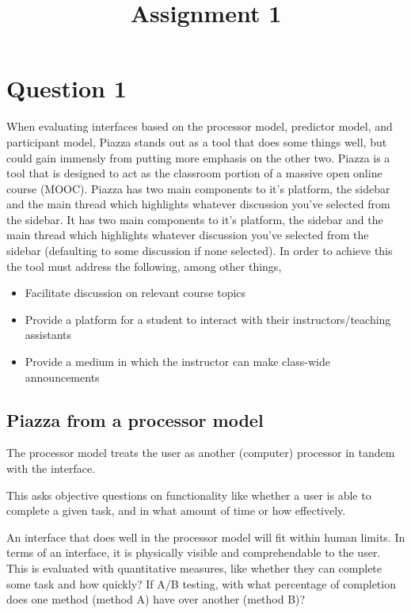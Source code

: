 

\title{Assignment 1\\}



\maketitle

\section{Question 1}
When evaluating interfaces based on the processor model, predictor model, and participant model, Piazza stands out as a tool that does some things well, but could gain immensly from putting more emphasis on the other two. Piazza is a tool that is designed to act as the classroom portion of a massive open online course (MOOC). Piazza has two main components to it's platform, the sidebar and the main thread which highlights whatever discussion you've selected from the sidebar. It has two main components to it's platform, the sidebar and the main thread which highlights whatever discussion you've selected from the sidebar (defaulting to some discussion if none selected). In order to achieve this the tool must address the following, among other things,

\begin{itemize}
\item
  Facilitate discussion on relevant course topics
\item
  Provide a platform for a student to interact with their instructors/teaching assistants
\item
  Provide a medium in which the instructor can make class-wide announcements
\end{itemize}

\subsection{Piazza from a processor model}

The processor model treats the user as another (computer) processor in tandem with the interface.

This asks objective questions on functionality like whether a user is able to complete a given task, and in what amount of time or how effectively.

An interface that does well in the processor model will fit within human limits. In terms of an interface, it is physically visible and comprehendable to the user. This is evaluated with quantitative measures, like whether they can complete some task and how quickly? If A/B testing, with what percentage of completion does one method (method A) have over another (method B)?

